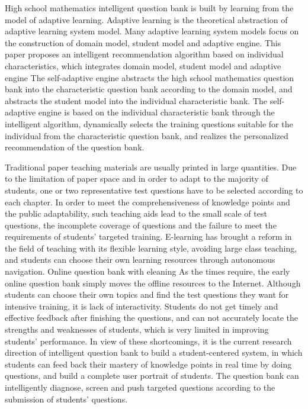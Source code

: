 
High school mathematics intelligent question bank is built by learning from the model of adaptive learning. Adaptive learning is the theoretical abstraction of adaptive learning system model. Many adaptive learning system models focus on the construction of domain model, student model and adaptive engine. This paper proposes an intelligent recommendation algorithm based on individual characteristics, which integrates domain model, student model and adaptive engine The self-adaptive engine abstracts the high school mathematics question bank into the characteristic question bank according to the domain model, and abstracts the student model into the individual characteristic bank. The self-adaptive engine is based on the individual characteristic bank through the intelligent algorithm, dynamically selects the training questions suitable for the individual from the characteristic question bank, and realizes the personalized recommendation of the question bank.

Traditional paper teaching materials are usually printed in large quantities. Due to the limitation of paper space and in order to adapt to the majority of students, one or two representative test questions have to be selected according to each chapter. In order to meet the comprehensiveness of knowledge points and the public adaptability, such teaching aids lead to the small scale of test questions, the incomplete coverage of questions and the failure to meet the requirements of students' targeted training. E-learning has brought a reform in the field of teaching with its flexible learning style, avoiding large class teaching, and students can choose their own learning resources through autonomous navigation. Online question bank with eleaning As the times require, the early online question bank simply moves the offline resources to the Internet. Although students can choose their own topics and find the test questions they want for intensive training, it is lack of interactivity. Students do not get timely and effective feedback after finishing the questions, and can not accurately locate the strengths and weaknesses of students, which is very limited in improving students' performance. In view of these shortcomings, it is the current research direction of intelligent question bank to build a student-centered system, in which students can feed back their mastery of knowledge points in real time by doing questions, and build a complete user portrait of students. The question bank can intelligently diagnose, screen and push targeted questions according to the submission of students' questions.

